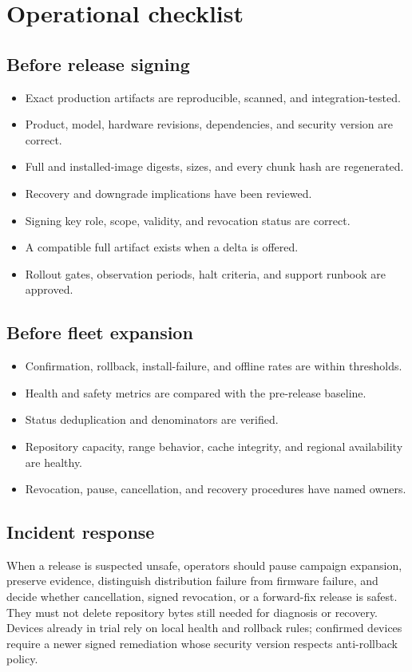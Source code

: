 \section{Operational checklist}

\subsection{Before release signing}

\begin{itemize}[label=$\square$]
  \item Exact production artifacts are reproducible, scanned, and integration-tested.
  \item Product, model, hardware revisions, dependencies, and security version are correct.
  \item Full and installed-image digests, sizes, and every chunk hash are regenerated.
  \item Recovery and downgrade implications have been reviewed.
  \item Signing key role, scope, validity, and revocation status are correct.
  \item A compatible full artifact exists when a delta is offered.
  \item Rollout gates, observation periods, halt criteria, and support runbook are approved.
\end{itemize}

\subsection{Before fleet expansion}

\begin{itemize}[label=$\square$]
  \item Confirmation, rollback, install-failure, and offline rates are within thresholds.
  \item Health and safety metrics are compared with the pre-release baseline.
  \item Status deduplication and denominators are verified.
  \item Repository capacity, range behavior, cache integrity, and regional availability are healthy.
  \item Revocation, pause, cancellation, and recovery procedures have named owners.
\end{itemize}

\subsection{Incident response}

When a release is suspected unsafe, operators should pause campaign expansion,
preserve evidence, distinguish distribution failure from firmware failure, and
decide whether cancellation, signed revocation, or a forward-fix release is safest.
They must not delete repository bytes still needed for diagnosis or recovery.
Devices already in trial rely on local health and rollback rules; confirmed
devices require a newer signed remediation whose security version respects
anti-rollback policy.

\appendix
